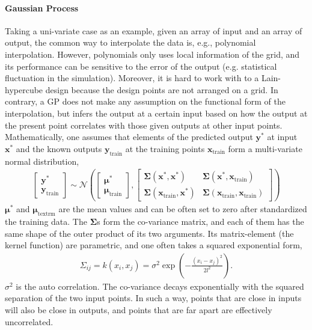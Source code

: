 \paragraph{Gaussian Process} Taking a uni-variate case as an example, given an array of input and an array of output, the common way to interpolate the data is, e.g., polynomial interpolation.
However, polynomials only uses local information of the grid, and its performance can be sensitive to the error of the output (e.g. statistical fluctuation in the simulation).
Moreover, it is hard to work with to a Lain-hypercube design because the design points are not arranged on a grid.
In contrary, a GP does not make any assumption on the functional form of the interpolation, but infers the output at a certain input based on how the output at the present point correlates with those given outputs at other input points.
Mathematically, one assumes that elements of the predicted output $\mathbf{y}^*$ at input $\mathbf{x^*}$ and the known outputs $\mathbf{y}_{\textrm{train}}$ at the training points $\mathbf{x}_{\textrm{train}}$ form a multi-variate normal distribution,
\begin{eqnarray}
\begin{bmatrix}
\mathbf{y}^* \\
\mathbf{y}_{\textrm{train}}
\end{bmatrix}
\sim
\mathcal{N}\left(
\begin{bmatrix}
\mathbf{\mu}^* \\
\mathbf{\mu}_{\textrm{train}}
\end{bmatrix},
\begin{bmatrix}
\mathbf{\Sigma}(\mathbf{x}^*, \mathbf{x}^*)& \mathbf{\Sigma}(\mathbf{x}^*, \mathbf{x}_{\textrm{train}}) \\
\mathbf{\Sigma}(\mathbf{x}_{\textrm{train}}, \mathbf{x}^*)& \mathbf{\Sigma}(\mathbf{x}_{\textrm{train}}, \mathbf{x}_{\textrm{train}})
\end{bmatrix}
\right)
\end{eqnarray}
$\mathbf{\mu}^*$ and $\mathbf{\mu}_{\textrm{textrm}}$ are the mean values and can be often set to zero after standardized the training data.
The $\mathbf{\Sigma}$s form the co-variance matrix, and each of them has the same shape of the outer product of its two arguments.
Its matrix-element (the kernel function) are parametric, and one often takes a squared exponential form,
\begin{eqnarray}
\Sigma_{ij} = k(x_i, x_j) = \sigma^2 \exp\left(-\frac{(x_i-x_j)^2}{2l^2}\right).
\end{eqnarray}
$\sigma^2$ is the auto correlation. 
The co-variance decays exponentially with the squared separation of the two input points.
In such a way, points that are close in inputs will also be close in outputs, and points that are far apart are effectively uncorrelated.

